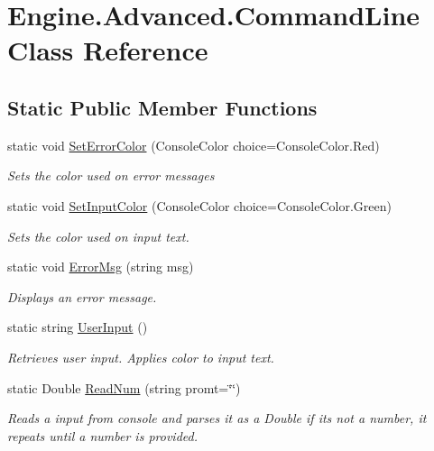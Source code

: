 \hypertarget{class_engine_1_1_advanced_1_1_command_line}{}\section{Engine.\+Advanced.\+Command\+Line Class Reference}
\label{class_engine_1_1_advanced_1_1_command_line}
\subsection*{Static Public Member Functions}
\begin{DoxyCompactItemize}
\item 
static void \mbox{\hyperlink{class_engine_1_1_advanced_1_1_command_line_a8eea19997325cadb8c6771e1d911a6d3}{Set\+Error\+Color}} (Console\+Color choice=Console\+Color.\+Red)
\begin{DoxyCompactList}\small\item\em Sets the color used on error messages \end{DoxyCompactList}\item 
static void \mbox{\hyperlink{class_engine_1_1_advanced_1_1_command_line_aa84025222b50083220bdb37762e37d23}{Set\+Input\+Color}} (Console\+Color choice=Console\+Color.\+Green)
\begin{DoxyCompactList}\small\item\em Sets the color used on input text. \end{DoxyCompactList}\item 
static void \mbox{\hyperlink{class_engine_1_1_advanced_1_1_command_line_a926a8ff590e7579867a97b022cea3bc8}{Error\+Msg}} (string msg)
\begin{DoxyCompactList}\small\item\em Displays an error message. \end{DoxyCompactList}\item 
static string \mbox{\hyperlink{class_engine_1_1_advanced_1_1_command_line_af50fbfb487964b724388fcf401ee3aad}{User\+Input}} ()
\begin{DoxyCompactList}\small\item\em Retrieves user input. Applies color to input text. \end{DoxyCompactList}\item 
static Double \mbox{\hyperlink{class_engine_1_1_advanced_1_1_command_line_a292a829c58f3099aee3a86aaa9e22ecf}{Read\+Num}} (string promt=\char`\"{}\char`\"{})
\begin{DoxyCompactList}\small\item\em Reads a input from console and parses it as a Double if it\textquotesingle{}s not a number, it repeats until a number is provided. \end{DoxyCompactList}\item 

\end{DoxyCompactItemize}
